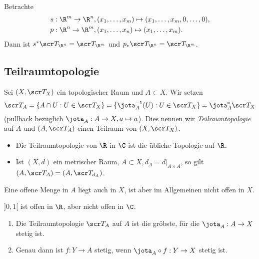 \begin{ex}
	Betrachte
	\begin{align*}
		s&: \R^m \to \R^n, (x_1,\dotsc, x_m) \mapsto (x_1, \dotsc, x_m, 0, \dotsc, 0), \\
		p&: \R^n \to \R^m, (x_1,\dotsc, x_n) \mapsto (x_1, \dotsc, x_m).
	\end{align*}
	Dann ist $s^* \scr T_{\R^n} = \scr T_{\R^m}$ und $p_* \scr T_{\R^n} = \scr T_{\R^m}$.
\end{ex}

\subsection{Teilraumtopologie}

\begin{df}
	Sei $(X, \scr T_X)$ ein topologischer Raum und $A \subset X$.
	Wir setzen
	\[
		\scr T_A = \{ A \cap U : U \in \scr T_X \}
		= \{ \jota_A^{-1}(U) : U \in \scr T_X \}
		= \jota_A^* \scr T_X
	\]
	(pullback bezüglich $\jota_A : A \to X, a \mapsto a$).
	Dies nennen wir \emph{Teilraumtopologie} auf $A$ und $(A, \scr T_A)$ einen Teilraum von $(X, \scr T_X)$.
\end{df}

\begin{ex}
	\begin{itemize}
		\item
			Die Teilraumtopologie von $\R$ in $\C$ ist die übliche Topologie auf $\R$.
		\item
			Ist $(X, d)$ ein metrischer Raum, $A \subset X, d_A = d|_{A\times A}$, so gilt $(A, \scr T_A) = (A, \scr T_{d_A})$.
	\end{itemize}
\end{ex}

\begin{nt}
	Eine offene Menge in $A$ liegt auch in $X$, ist aber im Allgemeinen nicht offen in $X$.

	$]0,1[$ ist offen in $\R$, aber nicht offen in $\C$.
\end{nt}

\begin{st}
	\begin{enumerate}[(1)]
		\item
			Die Teilraumtopologie $\scr T_A$ auf $A$ ist die gröbste, für die $\jota_A : A \to X$ stetig ist.
		\item
			Genau dann ist $f: Y \to A$ stetig, wenn $\jota_A \circ f: Y \to X$ stetig ist.
	\end{enumerate}
\end{st}


